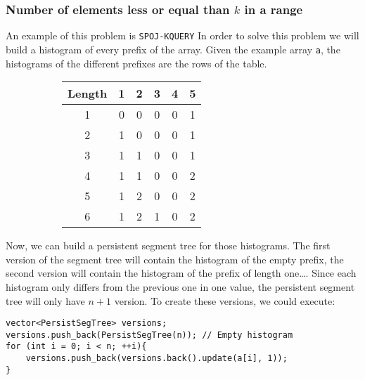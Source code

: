 \subsubsection{Number of elements less or equal than $k$ in a range}
An example of this problem is \texttt{SPOJ-KQUERY}
In order to solve this problem we will build a histogram of every prefix of
the array. Given the example array \texttt{a}, the histograms of the different
prefixes are the rows of the table.
\begin{figure}[h!]
		\centering
		\begin{subfigure}[t]{0.4\textwidth}
		\begin{center}
		\end{center}
		\end{subfigure}
		\begin{subfigure}[t]{0.55\textwidth}
		\begin{center}
				\begin{tabular}{c|ccccc}
						Length & 1 & 2 & 3 & 4 & 5 \\ \hline
							 1 & 0 & 0 & 0 & 0 & 1 \\
							 2 & 1 & 0 & 0 & 0 & 1 \\
							 3 & 1 & 1 & 0 & 0 & 1 \\
							 4 & 1 & 1 & 0 & 0 & 2 \\
							 5 & 1 & 2 & 0 & 0 & 2 \\
							 6 & 1 & 2 & 1 & 0 & 2 \\
				\end{tabular}
		\end{center}
		\end{subfigure}
\end{figure}
Now, we can build a persistent segment tree for those histograms. The first
version of the segment tree will contain the histogram of the empty
prefix, the second version will contain the histogram of the prefix of length
one\ldots. Since each histogram only differs from the previous one in one value,
the persistent segment tree will only have $n+1$ version. To create these 
versions, we could execute:
\begin{verbatim}
vector<PersistSegTree> versions;
versions.push_back(PersistSegTree(n)); // Empty histogram
for (int i = 0; i < n; ++i){
	versions.push_back(versions.back().update(a[i], 1));
}
\end{verbatim}

